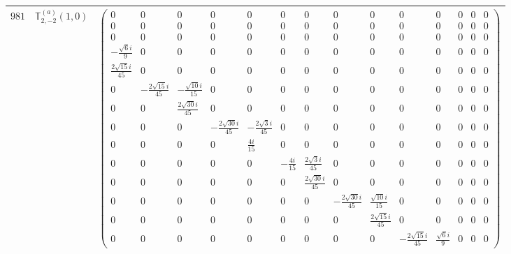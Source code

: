 \documentclass[fleqn,8pt,landscape]{jsarticle}
\begin{document}
\begin{center}
\begin{longtable}{ccc}
$ 981 $ & $ \mathbb{T}_{2,-2}^{(a)}(1,0) $ & $ \begin{pmatrix} 0 & 0 & 0 & 0 & 0 & 0 & 0 & 0 & 0 & 0 & 0 & 0 & 0 & 0 \\ 0 & 0 & 0 & 0 & 0 & 0 & 0 & 0 & 0 & 0 & 0 & 0 & 0 & 0 \\ 0 & 0 & 0 & 0 & 0 & 0 & 0 & 0 & 0 & 0 & 0 & 0 & 0 & 0 \\ - \frac{\sqrt{6} i}{9} & 0 & 0 & 0 & 0 & 0 & 0 & 0 & 0 & 0 & 0 & 0 & 0 & 0 \\ \frac{2 \sqrt{15} i}{45} & 0 & 0 & 0 & 0 & 0 & 0 & 0 & 0 & 0 & 0 & 0 & 0 & 0 \\ 0 & - \frac{2 \sqrt{15} i}{45} & - \frac{\sqrt{10} i}{15} & 0 & 0 & 0 & 0 & 0 & 0 & 0 & 0 & 0 & 0 & 0 \\ 0 & 0 & \frac{2 \sqrt{30} i}{45} & 0 & 0 & 0 & 0 & 0 & 0 & 0 & 0 & 0 & 0 & 0 \\ 0 & 0 & 0 & - \frac{2 \sqrt{30} i}{45} & - \frac{2 \sqrt{3} i}{45} & 0 & 0 & 0 & 0 & 0 & 0 & 0 & 0 & 0 \\ 0 & 0 & 0 & 0 & \frac{4 i}{15} & 0 & 0 & 0 & 0 & 0 & 0 & 0 & 0 & 0 \\ 0 & 0 & 0 & 0 & 0 & - \frac{4 i}{15} & \frac{2 \sqrt{3} i}{45} & 0 & 0 & 0 & 0 & 0 & 0 & 0 \\ 0 & 0 & 0 & 0 & 0 & 0 & \frac{2 \sqrt{30} i}{45} & 0 & 0 & 0 & 0 & 0 & 0 & 0 \\ 0 & 0 & 0 & 0 & 0 & 0 & 0 & - \frac{2 \sqrt{30} i}{45} & \frac{\sqrt{10} i}{15} & 0 & 0 & 0 & 0 & 0 \\ 0 & 0 & 0 & 0 & 0 & 0 & 0 & 0 & \frac{2 \sqrt{15} i}{45} & 0 & 0 & 0 & 0 & 0 \\ 0 & 0 & 0 & 0 & 0 & 0 & 0 & 0 & 0 & - \frac{2 \sqrt{15} i}{45} & \frac{\sqrt{6} i}{9} & 0 & 0 & 0 \end{pmatrix} $ \\ \hline

\end{longtable}
\end{center}
\end{document}
